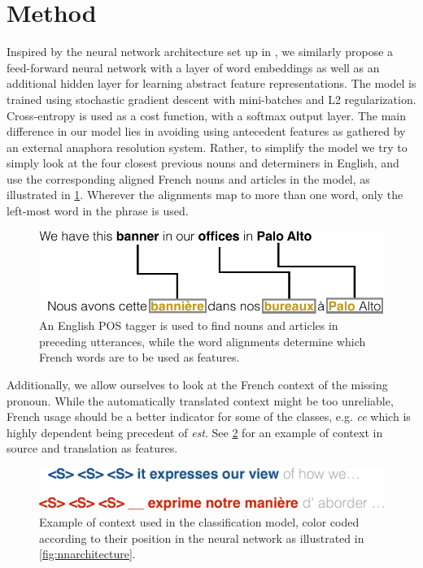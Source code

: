 \documentclass[11pt]{article}
\begin{document}
\section{Method}

Inspired by the neural network architecture set up in \textcite{Hardmeier2013Latent}, we similarly propose a feed-forward neural network with a layer of word embeddings as well as an additional hidden layer for learning abstract feature representations.
The model is trained using stochastic gradient descent with mini-batches and L2 regularization.
Cross-entropy is used as a cost function, with a softmax output layer.
The main difference in our model lies in avoiding using antecedent features as gathered by an external anaphora resolution system.
Rather, to simplify the model we try to simply look at the four closest previous nouns and determiners in English, and use the corresponding aligned French nouns and articles in the model, as illustrated in \cref{fig:posexample}.
Wherever the alignments map to more than one word, only the left-most word in the phrase is used.

\begin{figure}[htbp]
    \centering
    \includegraphics[width=\columnwidth]{figures/posexample.pdf}
    \caption{An English POS tagger is used to find nouns and articles in preceding utterances, while the word alignments determine which French words are to be used as features.}
    \label{fig:posexample}
\end{figure}


Additionally, we allow ourselves to look at the French context of the missing pronoun.
While the automatically translated context might be too unreliable, French usage should be a better indicator for some of the classes, e.g. \emph{ce} which is highly dependent being precedent of \emph{est}.
See \cref{fig:contextexample} for an example of context in source and translation as features.

\begin{figure}[htbp]
    \centering
    \includegraphics[width=\columnwidth]{figures/contextexample.pdf}
    \caption{Example of context used in the classification model, color coded according to their position in the neural network as illustrated in \cref{fig:nnarchitecture}.}
    \label{fig:contextexample}
\end{figure}
\end{document}
